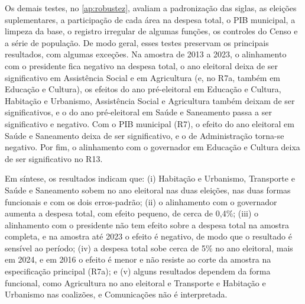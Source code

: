 Os demais testes, no \autoref{ap:robustez}, avaliam a padronização das siglas, as eleições suplementares, a participação de cada área na despesa total, o PIB municipal, a limpeza da base, o registro irregular de algumas funções, os controles do Censo e a série de população. De modo geral, esses testes preservam os principais resultados, com algumas exceções. Na amostra de 2013 a 2023, o alinhamento com o presidente fica negativo na despesa total, o ano eleitoral deixa de ser significativo em Assistência Social e em Agricultura (e, no R7a, também em Educação e Cultura), os efeitos do ano pré-eleitoral em Educação e Cultura, Habitação e Urbanismo, Assistência Social e Agricultura também deixam de ser significativos, e o do ano pré-eleitoral em Saúde e Saneamento passa a ser significativo e negativo. Com o PIB municipal (R7), o efeito do ano eleitoral em Saúde e Saneamento deixa de ser significativo, e o de Administração torna-se negativo. Por fim, o alinhamento com o governador em Educação e Cultura deixa de ser significativo no R13.

Em síntese, os resultados indicam que: (i) Habitação e Urbanismo, Transporte e Saúde e Saneamento sobem no ano eleitoral nas duas eleições, nas duas formas funcionais e com os dois erros-padrão; (ii) o alinhamento com o governador aumenta a despesa total, com efeito pequeno, de cerca de 0,4\%; (iii) o alinhamento com o presidente não tem efeito sobre a despesa total na amostra completa, e na amostra até 2023 o efeito é negativo, de modo que o resultado é sensível ao período; (iv) a despesa total sobe cerca de 5\% no ano eleitoral, mais em 2024, e em 2016 o efeito é menor e não resiste ao corte da amostra na especificação principal (R7a); e (v) alguns resultados dependem da forma funcional, como Agricultura no ano eleitoral e Transporte e Habitação e Urbanismo nas coalizões, e Comunicações não é interpretada.


